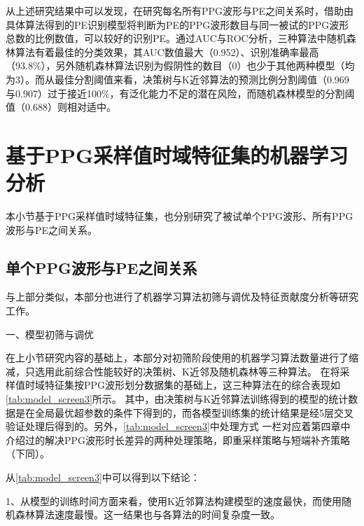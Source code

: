 从上述研究结果中可以发现，在研究每名所有PPG波形与PE之间关系时，借助由具体算法得到的PE识别模型将判断为PE的PPG波形数目与同一被试的PPG波形总数的比例数值，可以较好的识别PE。通过AUC与ROC分析，三种算法中随机森林算法有着最佳的分类效果，其AUC数值最大（0.952）、识别准确率最高
（93.8\%），另外随机森林算法识别为假阴性的数目（0）也少于其他两种模型（均为3）。而从最佳分割阈值来看，决策树与K近邻算法的预测比例分割阈值（0.969与0.907）过于接近100\%，有泛化能力不足的潜在风险，而随机森林模型的分割阈值（0.688）则相对适中。

\section{基于PPG采样值时域特征集的机器学习分析}
本小节基于PPG采样值时域特征集，也分别研究了被试单个PPG波形、所有PPG波形与PE之间关系。

\subsection{单个PPG波形与PE之间关系}
与上部分类似，本部分也进行了机器学习算法初筛与调优及特征贡献度分析等研究工作。

一、模型初筛与调优

在上小节研究内容的基础上，本部分对初筛阶段使用的机器学习算法数量进行了缩减，只选用此前综合性能较好的决策树、K近邻及随机森林等三种算法。
在将采样值时域特征集按PPG波形划分数据集的基础上，这三种算法在的综合表现如\autoref{tab:model_screen3}所示。
其中，由决策树与K近邻算法训练得到的模型的统计数据是在全局最优超参数的条件下得到的，而各模型训练集的统计结果是经5层交叉验证处理后得到的。另外，\autoref{tab:model_screen3}中处理方式
一栏对应着第四章中介绍过的解决PPG波形时长差异的两种处理策略，即重采样策略与短端补齐策略（下同）。

从\autoref{tab:model_screen3}中可以得到以下结论：

1、从模型的训练时间方面来看，使用K近邻算法构建模型的速度最快，而使用随机森林算法速度最慢。这一结果也与各算法的时间复杂度一致。

